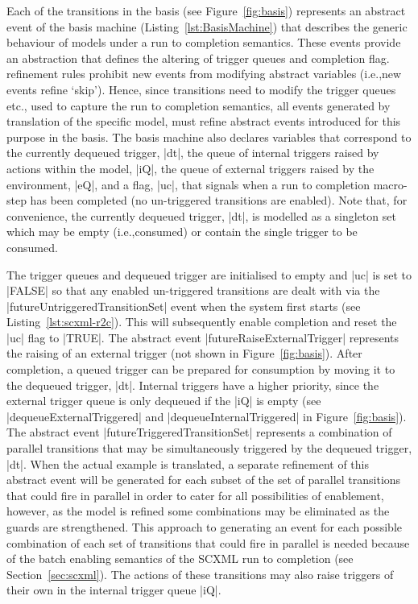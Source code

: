 Each of the transitions in the basis (see Figure~\ref{fig:basis}) represents an abstract event of the basis machine (Listing~\ref{lst:BasisMachine}) that describes the generic behaviour of models under a run to completion semantics.
These events provide an abstraction that defines the altering of trigger queues and completion flag. 
\EventB refinement rules prohibit new events from modifying abstract variables (i.e.,new events refine `skip').
Hence, since \SCXML transitions need to modify the trigger queues etc., used to capture the \SCXML run to completion semantics, all events generated by translation of the specific \SCXML model,  must refine abstract events introduced for this purpose in the basis.
The basis machine also declares variables that correspond to the currently dequeued trigger,  |dt|, 
the queue of internal triggers raised by actions within the model, |iQ|, 
the queue of external triggers raised by the environment, |eQ|,
and a flag, |uc|, that signals when a run to completion macro-step has been completed 
(no un-triggered transitions are enabled). 
Note that, for convenience, the currently dequeued trigger, |dt|, is modelled as a singleton set which may be empty (i.e.,consumed) or contain the single trigger to be consumed.

The trigger queues and dequeued trigger are initialised to empty and |uc| is set to |FALSE| so that any enabled un-triggered transitions are dealt with via the |futureUntriggeredTransitionSet| event when the system first starts (see Listing~\ref{lst:scxml-r2c}).
This will subsequently enable completion and reset the |uc| flag to |TRUE|.
The abstract event |futureRaiseExternalTrigger| represents the raising  of an external trigger (not shown in Figure~\ref{fig:basis}).    
After completion, a queued trigger can be prepared for consumption by moving it to the dequeued trigger, |dt|.
Internal triggers have a higher priority, since the external trigger queue is only dequeued if the |iQ| is empty (see |dequeueExternalTriggered| and |dequeueInternalTriggered| in Figure~\ref{fig:basis}).
The abstract event |futureTriggeredTransitionSet| represents a combination of parallel transitions that may be simultaneously triggered by the dequeued trigger, |dt|.
When the actual example \SCXML is translated, a separate refinement of this abstract event will be generated for each subset of the set of parallel transitions that could fire in parallel in order to cater for all possibilities of enablement, however, as the model is refined some combinations may be eliminated as the guards are strengthened.
This approach to generating an event for each possible combination of each set of transitions that could fire in parallel is needed because of the batch enabling semantics of the SCXML run to completion (see Section~\ref{sec:scxml}).
The actions of these transitions may also raise triggers of their own in the internal trigger queue |iQ|.


